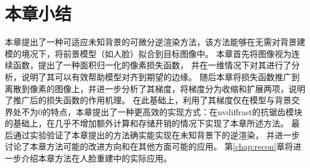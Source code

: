 \section*{本章小结}

本章提出了一种可适应未知背景的可微分逆渲染方法，该方法能够在无需对背景建模的境况下，将前景模型（如人脸）拟合到目标图像中。
本章首先将图像视为连续函数，提出了一种面积归一化的像素损失函数，
并在一维情况下对其进行了分析，说明了其可以有效帮助模型对齐到期望的边缘。
随后本章将损失函数推广到离散到像素的图像上，并进一步分析了其梯度，将梯度分为收缩和扩展两项，说明了推广后的损失函数的作用机理。
在此基础上，利用了其梯度仅在模型与背景交界处不为0的特点，本章提出了一种更高效的实现方式：在nvdiffrast的抗锯齿模块的基础上，在几乎不增加额外计算和存储开销的情况下实现了本章所述方法。
最后通过实验验证了本章提出的方法确实能实现在未知背景下的逆渲染，
并进一步讨论了本章方法可能的改进方向和在其他方面可能的应用。
第\ref{chap:recon}章将进一步介绍本章方法在人脸重建中的实际应用。
